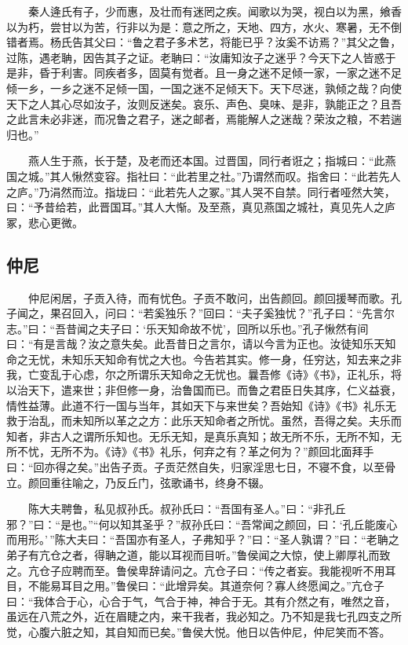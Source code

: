 　　秦人逄氏有子，少而惠，及壮而有迷罔之疾。闻歌以为哭，视白以为黑，飨香以为朽，尝甘以为苦，行非以为是：意之所之，天地、四方，水火、寒暑，无不倒错者焉。杨氏告其父曰：``鲁之君子多术艺，将能已乎？汝奚不访焉？''其父之鲁，过陈，遇老聃，因告其子之证。老聃曰：``汝庸知汝子之迷乎？今天下之人皆惑于是非，昏于利害。同疾者多，固莫有觉者。且一身之迷不足倾一家，一家之迷不足倾一乡，一乡之迷不足倾一国，一国之迷不足倾天下。天下尽迷，孰倾之哉？向使天下之人其心尽如汝子，汝则反迷矣。哀乐、声色、臭味、是非，孰能正之？且吾之此言未必非迷，而况鲁之君子，迷之邮者，焉能解人之迷哉？荣汝之粮，不若遄归也。''

　　燕人生于燕，长于楚，及老而还本国。过晋国，同行者诳之；指城曰：``此燕国之城。''其人愀然变容。指社曰：``此若里之社。''乃谓然而叹。指舍曰：``此若先人之庐。''乃涓然而泣。指垅曰：``此若先人之冢。''其人哭不自禁。同行者哑然大笑，曰：``予昔给若，此晋国耳。''其人大惭。及至燕，真见燕国之城社，真见先人之庐冢，悲心更微。

\hypertarget{ux4ef2ux5c3c}{%
\subsection{仲尼}\label{ux4ef2ux5c3c}}

　　仲尼闲居，子贡入待，而有忧色。子贡不敢问，出告颜回。颜回援琴而歌。孔子闻之，果召回入，问曰：``若奚独乐？''回曰：``夫子奚独忧？''孔子曰：``先言尔志。''曰：``吾昔闻之夫子曰：`乐天知命故不忧'，回所以乐也。''孔子愀然有间曰：``有是言哉？汝之意失矣。此吾昔日之言尔，请以今言为正也。汝徒知乐天知命之无忧，未知乐天知命有忧之大也。今告若其实。修一身，任穷达，知去来之非我，亡变乱于心虑，尔之所谓乐天知命之无忧也。曩吾修《诗》《书》，正礼乐，将以治天下，遣来世；非但修一身，治鲁国而已。而鲁之君臣日失其序，仁义益衰，情性益薄。此道不行一国与当年，其如天下与来世矣？吾始知《诗》《书》礼乐无救于治乱，而未知所以革之之方：此乐天知命者之所忧。虽然，吾得之矣。夫乐而知者，非古人之谓所乐知也。无乐无知，是真乐真知；故无所不乐，无所不知，无所不忧，无所不为。《诗》《书》礼乐，何弃之有？革之何为？''颜回北面拜手曰：``回亦得之矣。''出告子贡。子贡茫然自失，归家淫思七日，不寝不食，以至骨立。颜回重往喻之，乃反丘门，弦歌诵书，终身不辍。

　　陈大夫聘鲁，私见叔孙氏。叔孙氏曰：``吾国有圣人。''曰：``非孔丘邪？''曰：``是也。''``何以知其圣乎？''叔孙氏曰：``吾常闻之颜回，曰：`孔丘能废心而用形。'\,''陈大夫曰：``吾国亦有圣人，子弗知乎？''曰：``圣人孰谓？''曰：``老聃之弟子有亢仓之者，得聃之道，能以耳视而目听。''鲁侯闻之大惊，使上卿厚礼而致之。亢仓子应聘而至。鲁侯卑辞请问之。亢仓子曰：``传之者妄。我能视听不用耳目，不能易耳目之用。''鲁侯曰：``此增异矣。其道奈何？寡人终愿闻之。''亢仓子曰：``我体合于心，心合于气，气合于神，神合于无。其有介然之有，唯然之音，虽远在八荒之外，近在眉睫之内，来干我者，我必知之。乃不知是我七孔四支之所觉，心腹六脏之知，其自知而已矣。''鲁侯大悦。他日以告仲尼，仲尼笑而不答。

